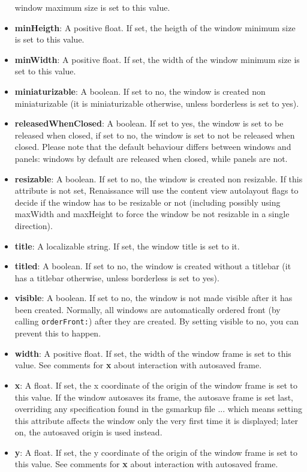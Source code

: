 \begin{itemize}
  window maximum size is set to this value.
\item {\bf minHeigth}: A positive float.  If set, the heigth of the
  window minimum size is set to this value.
\item {\bf minWidth}: A positive float.  If set, the width of the
  window minimum size is set to this value.
\item {\bf miniaturizable}: A boolean.  If set to no, the window is
  created non miniaturizable (it is miniaturizable otherwise, unless
  borderless is set to yes).
\item {\bf releasedWhenClosed}: A boolean.  If set to yes, the window
  is set to be released when closed, if set to no, the window is set
  to not be released when closed.  Please note that the default
  behaviour differs between windows and panels: windows by default are
  released when closed, while panels are not.
\item {\bf resizable}: A boolean.  If set to no, the window is created
  non resizable.  If this attribute is not set, Renaissance will use
  the content view autolayout flags to decide if the window has to be
  resizable or not (including possibly using maxWidth and maxHeight to
  force the window be not resizable in a single direction).
\item {\bf title}: A localizable string.  If set, the window title is
  set to it.
\item {\bf titled}: A boolean.  If set to no, the window is created
  without a titlebar (it has a titlebar otherwise, unless borderless
  is set to yes).
\item {\bf visible}: A boolean.  If set to no, the window is not made
  visible after it has been created.  Normally, all windows are
  automatically ordered front (by calling \texttt{orderFront:}) after
  they are created.  By setting visible to no, you can prevent this to
  happen.
\item {\bf width}: A positive float.  If set, the width of the window
  frame is set to this value.  See comments for {\bf x} about
  interaction with autosaved frame.
\item {\bf x}: A float.  If set, the x coordinate of the origin of the
  window frame is set to this value.  If the window autosaves its
  frame, the autosave frame is set last, overriding any specification
  found in the gsmarkup file ... which means setting this attribute
  affects the window only the very first time it is displayed; later
  on, the autosaved origin is used instead.
\item {\bf y}: A float.  If set, the y coordinate of the origin of the
  window frame is set to this value.  See comments for {\bf x} about
  interaction with autosaved frame.
\end{itemize}

